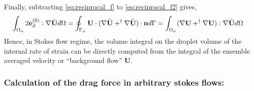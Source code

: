 Finally, subtracting  \ref{eq:reciprocal_f} to \ref{eq:reciprocal_f2} gives,
\begin{equation}
    \int_{\Omega_{\alpha}}  2\textbf{e}_d^{(0)} : \mathbf{\nabla} \hat{\textbf{U}}  d\Omega
    = 
    \oint_{\Gamma_{\alpha}}   \textbf{U} \cdot (\mathbf{\nabla} \hat{\textbf{U}} + ^\dagger\mathbf{\nabla} \hat{\textbf{U}})  \cdot \textbf{n} d\Gamma
    = 
    \int_{\Omega_{\alpha}}   (\mathbf{\nabla} {\textbf{U}} + ^\dagger\mathbf{\nabla} {\textbf{U}}) : \mathbf{\nabla} \hat{\textbf{U}}  d\Omega
\end{equation}
Hence, in Stokes flow regime, the volume integral on the droplet volume of the internal rate of strain can be directly computed from the integral of the ensemble averaged velocity or ``background flow'' $\textbf{U}$. 


\subsubsection{Calculation of the drag force in arbitrary stokes flows:}

